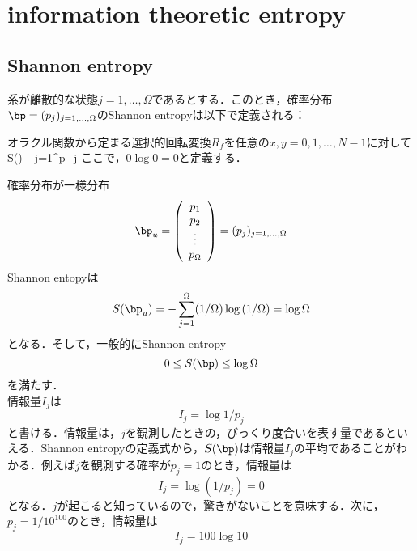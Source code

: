 \section{information theoretic entropy}
\subsection{Shannon entropy}
系が離散的な状態$j=1,\ldots,\Omega$であるとする．このとき，確率分布$\bp=(p_j)_{j=1,\ldots,\Omega}$のShannon entropyは以下で定義される：
\begin{kotak}
	\begin{definition}
	オラクル関数から定まる選択的回転変換$R_f$を任意の$x,y=0,1,\ldots,N-1$に対して
	\be
	S(\bp)\equiv-\sum_{j=1}^{\Omega}p_j
	\ee
	ここで，$0\log0=0$と定義する．
	\end{definition}
\end{kotak}
確率分布が一様分布
\begin{equation}
    \bp_u= \left(
        \begin{array}{c}
        p_1 \\
        p_2 \\
        \vdots \\
        p_\Omega
        \end{array}
        \right)
        =(p_j)_{j=1,\ldots,\Omega}
\end{equation}
Shannon entopyは
\begin{equation}
    S(\bp_{u})=-\sum_{j=1}^{\Omega}(1/\Omega)\log{(1/\Omega)}
    =\log{\Omega}
\end{equation}
となる．そして，一般的にShannon entropy
\begin{equation}
    0\leq S(\bp)\leq\log{\Omega}
\end{equation}
を満たす．\\
情報量$I_j$は
\begin{equation}
    I_j=\log{1/p_j}
\end{equation}
と書ける．情報量は，$j$を観測したときの，びっくり度合いを表す量であるといえる．Shannon entropyの定義式から，$S(\bp)$は情報量$I_j$の平均であることがわかる．例えば$j$を観測する確率が$p_j=1$のとき，情報量は
\begin{equation}
    I_j=\log{(1/p_j)}=0
\end{equation}
となる．$j$が起こると知っているので，驚きがないことを意味する．次に，$p_j=1/10^{100}$のとき，情報量は
\begin{equation}
    I_j=100\log{10}
\end{equation}
